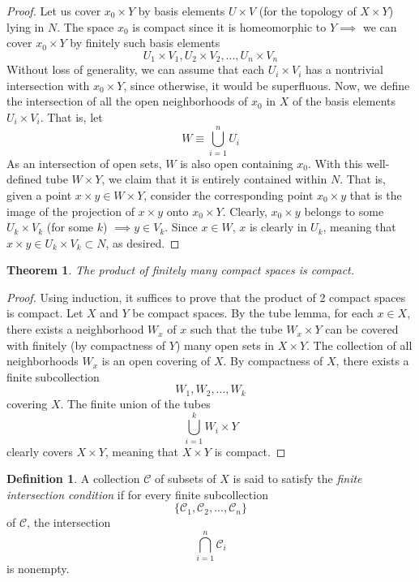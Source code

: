 \documentclass{article}
\newtheorem{theorem}{Theorem}[section]
\theoremstyle{remark}
\theoremstyle{definition}
\newtheorem{definition}{Definition}[section]
\begin{document}
\begin{proof}
Let us cover $x_0 \times Y$ by basis elements $U \times V$ (for the topology of $X \times Y$) lying in $N$. The space $x_0$ is compact since it is homeomorphic to $Y \implies$ we can cover $x_0 \times Y$ by finitely such basis elements
\[U_1 \times V_1, U_2 \times V_2, ..., U_n \times V_n\]
Without loss of generality, we can assume that each $U_i \times V_i$ has a nontrivial intersection with $x_0 \times Y$, since otherwise, it would be superfluous. Now, we define the intersection of all the open neighborhoods of $x_0$ in $X$ of the basis elements $U_i \times V_i$. That is, let
\[W \equiv \bigcup_{i=1}^n U_i\]
As an intersection of open sets, $W$ is also open containing $x_0$. With this well-defined tube $W \times Y$, we claim that it is entirely contained within $N$. That is, given a point $x \times y \in W \times Y$, consider the corresponding point $x_0 \times y$ that is the image of the projection of $x\times y$ onto $x_0 \times Y$. Clearly, $x_0 \times y$ belongs to some $U_k \times V_k$ (for some $k$) $\implies y \in V_k$. Since $x \in W$, $x$ is clearly in $U_k$, meaning that $x \times y \in U_k \times V_k \subset N$, as desired. 
\end{proof}

\begin{theorem}
The product of finitely many compact spaces is compact. 
\end{theorem}
\begin{proof}
Using induction, it suffices to prove that the product of 2 compact spaces is compact. Let $X$ and $Y$ be compact spaces. By the tube lemma, for each $x \in X$, there exists a neighborhood $W_x$ of $x$ such that the tube $W_x \times Y$ can be covered with finitely (by compactness of $Y$) many open sets in $X \times Y$. The collection of all neighborhoods $W_x$ is an open covering of $X$. By compactness of $X$, there exists a finite subcollection
\[W_1, W_2, ..., W_k\]
covering $X$. The finite union of the tubes 
\[\bigcup_{i=1}^k W_i \times Y\]
clearly covers $X \times Y$, meaning that $X \times Y$ is compact. 
\end{proof}

\begin{definition}
A collection $\mathcal{C}$ of subsets of $X$ is said to satisfy the \textit{finite intersection condition} if for every finite subcollection 
\[\{\mathcal{C}_1, \mathcal{C}_2, ..., \mathcal{C}_n\}\]
of $\mathcal{C}$, the intersection
\[\bigcap_{i=1}^n \mathcal{C}_i\]
is nonempty. 
\end{definition}
\end{document}
